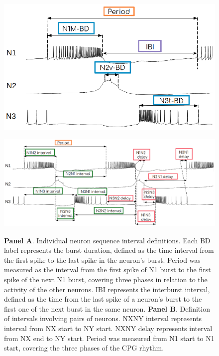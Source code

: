 \begin{figure}
\centering
\begin{minipage}{\textwidth}
\centering
\includegraphics[scale=0.8]{img/methods-paper-modelo/figure4a.eps} 
\label{fig:intervals_bd}
\end{minipage}

    \vspace{1cm}
\begin{minipage}[t]{\textwidth}
\centering
\includegraphics[scale=0.8]{img/methods-paper-modelo/figure4b.eps} 
\label{fig:intervals_der}
\end{minipage}
 
 \caption{\textbf{Panel A}. Individual neuron sequence interval definitions. Each BD label represents the burst duration, defined as the time interval from the first spike to the last spike in the neuron's burst. Period was measured as the interval from the first spike of N1 burst to the first spike of the next N1 burst, covering three phases %
 in relation to the activity of the other neurons. IBI represents the interburst interval, defined as the time from the last spike of a neuron's burst to the first one of the next burst in the same neuron.
    \textbf{Panel B}. Definition of intervals involving pairs of neurons. NXNY interval represents interval from NX start to NY start. NXNY delay represents interval from NX end to NY start. Period was measured from N1 start to N1 start, covering the three phases of the CPG rhythm.
    }
    
    \label{fig:intervals}
\end{figure}
